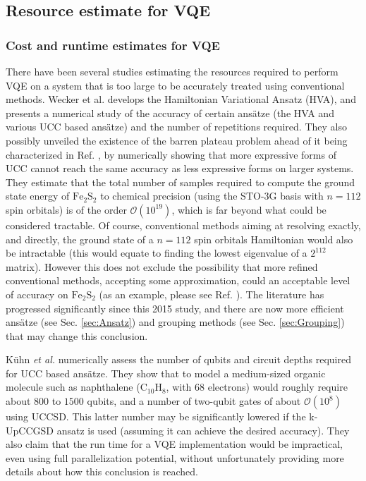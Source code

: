 \subsection{Resource estimate for VQE} \label{sec:resource_estimates}

\subsubsection{Cost and runtime estimates for VQE}

There have been several studies estimating the resources required to perform VQE on a system that is too large to be accurately treated using conventional methods. Wecker et al. \cite{Wecker2015} develops the Hamiltonian Variational Ansatz (HVA), and presents a numerical study of the accuracy of certain ans{\"{a}}tze (the HVA and various UCC based ans{\"{a}}tze) and the number of repetitions required. They also possibly unveiled the existence of the barren plateau problem ahead of it being characterized in Ref. \cite{McClean2018}, by numerically showing that more expressive forms of UCC cannot reach the same accuracy as less expressive forms on larger systems. They estimate that the total number of samples required to compute the ground state energy of $\mathrm{Fe_2S_2}$ to chemical precision (using the STO-3G basis with $n=112$ spin orbitals) is of the order $\mathcal{O}(10^{19})$, which is far beyond what could be considered tractable. Of course, conventional methods aiming at resolving exactly, and directly, the ground state of a $n=112$ spin orbitals Hamiltonian would also be intractable (this would equate to finding the lowest eigenvalue of a $2^{112}$ matrix). However this does not exclude the possibility that more refined conventional methods, accepting some approximation, could an acceptable level of accuracy on $\mathrm{Fe_2S_2}$ (as an example, please see Ref. \cite{Li2013}). The literature has progressed significantly since this 2015 study, and there are now more efficient ans\"atze (see Sec. \ref{sec:Ansatz}) and grouping methods (see Sec. \ref{sec:Grouping}) that may change this conclusion. 

K\"uhn \textit{et al.} \cite{Kuhn2019} numerically assess the number of qubits and circuit depths required for UCC based ans{\"{a}}tze. They show that to model a medium-sized organic molecule such as naphthalene ($\mathrm{C_{10}H_8}$, with $68$ electrons) would roughly require about $800$ to $1500$ qubits, and a number of two-qubit gates of about $\mathcal{O}(10^8)$ using UCCSD. This latter number may be significantly lowered if the k-UpCCGSD ansatz is used (assuming it can achieve the desired accuracy). They also claim that the run time for a VQE implementation would be impractical, even using full parallelization potential, without unfortunately providing more details about how this conclusion is reached. 

